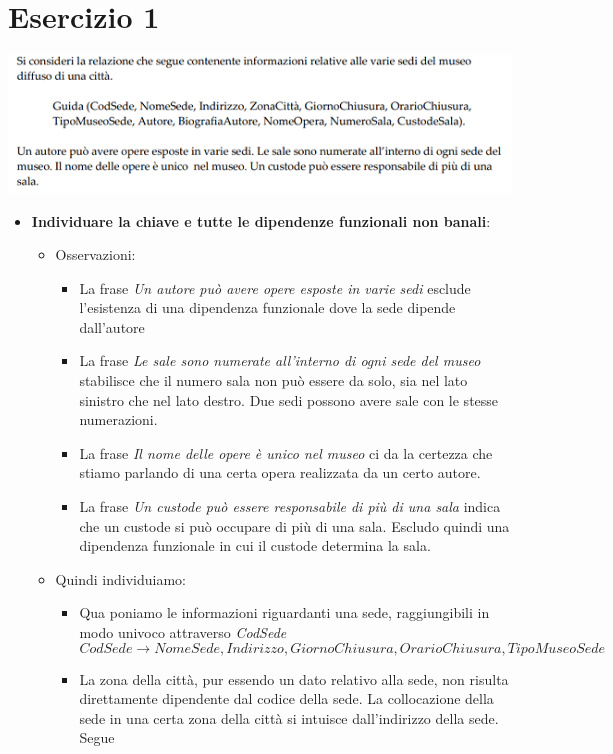 \section{Esercizio 1}
\begin{center}
	\includegraphics{images/222.PNG}
\end{center}
\begin{itemize}
	\item \textbf{Individuare la chiave e tutte le dipendenze funzionali non banali}:
	\begin{itemize}
		\item Osservazioni:
		\begin{itemize}
			\item La frase \emph{Un autore può avere opere esposte in varie sedi} esclude l'esistenza di una dipendenza funzionale dove la sede dipende dall'autore
			\item La frase \emph{Le sale sono numerate all'interno di ogni sede del museo} stabilisce che il numero sala non può essere da solo, sia nel lato sinistro che nel lato destro. Due sedi possono avere sale con le stesse numerazioni.
			\item La frase \emph{Il nome delle opere è unico nel museo} ci da la certezza che stiamo parlando di una certa opera realizzata da un certo autore.
			\item La frase \emph{Un custode può essere responsabile di più di una sala} indica che un custode si può occupare di più di una sala. Escludo quindi una dipendenza funzionale in cui il custode determina la sala.
		\end{itemize}
		\item Quindi individuiamo:
		\begin{itemize}
			\item Qua poniamo le informazioni riguardanti una sede, raggiungibili in modo univoco attraverso \emph{CodSede}
			\[CodSede \to NomeSede, Indirizzo, GiornoChiusura, OrarioChiusura, TipoMuseoSede\]
			\item La zona della città, pur essendo un dato relativo alla sede, non risulta direttamente dipendente dal codice della sede. La collocazione della sede in una certa zona della città si intuisce dall'indirizzo della sede. Segue

\end{itemize}
\end{itemize}
\end{itemize}
